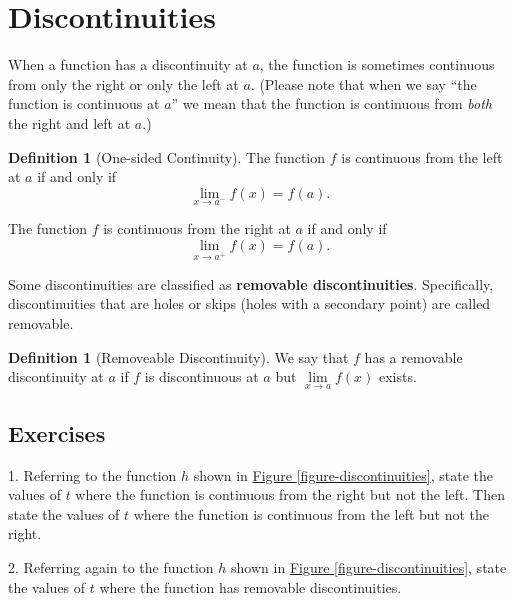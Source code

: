 \documentclass[10pt,oneside,]{book}
\newcommand{\terminology}[1]{\textbf{#1}}
\theoremstyle{plain}
\theoremstyle{definition}
\newtheorem{definition}[theorem]{Definition}
\numberwithin{equation}{section}
\newcommand{\fe}[2]{#1\mathopen{}\left(#2\right)\mathclose{}}
\begin{document}
\section[Discontinuities]{Discontinuities}\label{section-discontinuities}
When a function has a discontinuity at \(a\), the function is sometimes continuous from only the right or only the left at \(a\). (Please note that when we say ``the function is continuous at \(a\)'' we mean that the function is continuous from \emph{both} the right and left at \(a\).)%
\begin{definition}[One-sided Continuity]\label{definition-4}
The function \(f\) is continuous from the left at \(a\) if and only if \[\lim\limits_{x\to a^{-}}\fe{f}{x}=\fe{f}{a}\text{.}\]%
\par
The function \(f\) is continuous from the right at \(a\) if and only if \[\lim\limits_{x\to a^{+}}\fe{f}{x}=\fe{f}{a}\text{.}\]%
\end{definition}
\par
Some discontinuities are classified as \terminology{removable discontinuities}. Specifically, discontinuities that are holes or skips (holes with a secondary point) are called removable.%
\begin{definition}[Removeable Discontinuity]\label{definition-5}
We say that \(f\) has a removable discontinuity at \(a\) if \(f\) is discontinuous at \(a\) but \(\lim\limits_{x\to a}\fe{f}{x}\) exists.%
\end{definition}
\typeout{************************************************}
\typeout{************************************************}
\subsection[Exercises]{Exercises}\label{exercises-14}
\begin{exerciselist}
\item[1.]\hypertarget{exercise-111}{\null}Referring to the function \(h\) shown in \hyperref[figure-discontinuities]{Figure \ref{figure-discontinuities}}, state the values of \(t\) where the function is continuous from the right but not the left. Then state the values of \(t\) where the function is continuous from the left but not the right.%
\par\smallskip
\item[2.]\hypertarget{exercise-112}{\null}Referring again to the function \(h\) shown in \hyperref[figure-discontinuities]{Figure \ref{figure-discontinuities}}, state the values of \(t\) where the function has removable discontinuities.%
\par\smallskip
\end{exerciselist}
\typeout{************************************************}
\typeout{************************************************}
\end{document}
